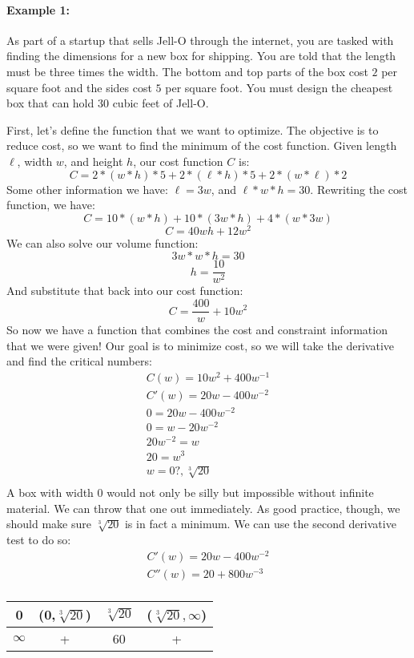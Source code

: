 \documentclass[../revisedmain.tex]{subfiles}
\begin{document}
	\paragraph{Example 1:} As part of a startup that sells Jell-O\textsuperscript{\textregistered} through the internet, you are tasked with finding the dimensions for a new box for shipping. You are told that the length must be three times the width. The bottom and top parts of the box cost $2$ per square foot and the sides cost $5$ per square foot. You must design the cheapest box that can hold $30$ cubic feet of Jell-O\textsuperscript{\textregistered}.\\\newline\par First, let's define the function that we want to optimize. The objective is to reduce cost, so we want to find the minimum of the cost function. Given length $\ell$, width $w$, and height $h$, our cost function $C$ is:
	\[
	C=2*(w*h)*5+2*(\ell*h)*5+2*(w*\ell)*2
	\]
	Some other information we have: $\ell=3w$, and $\ell*w*h=30$. Rewriting the cost function, we have:
	\[
	C=10*(w*h)+10*(3w*h)+4*(w*3w)
	\]
	\[
	C=40wh+12w^2
	\]
	We can also solve our volume function:\[3w*w*h=30\]\[h=\frac{10}{w^2}\] And substitute that back into our cost function:
	\[
	C=\frac{400}{w}+10w^2
	\]
	So now we have a function that combines the cost and constraint information that we were given! Our goal is to minimize cost, so we will take the derivative and find the critical numbers:
	\begin{gather*}
		C(w)=10w^2+400w^{-1}\\
		C'(w)=20w-400w^{-2}\\
		0=20w-400w^{-2}\\
		0=w-20w^{-2}\\
		20w^{-2}=w\\
		20=w^3\\
		w=0?,\sqrt[3]{20}\\
	\end{gather*}
	A box with width $0$ would not only be silly but impossible without infinite material. We can throw that one out immediately. As good practice, though, we should make sure $\sqrt[3]{20}$ is in fact a minimum. We can use the second derivative test to do so:
	\begin{gather*}
		C'(w)=20w-400w^{-2}\\
		C''(w)=20+800w^{-3}\\
	\end{gather*}
	\begin{center}
		\begin{tabular}{ |c|c|c|c| } 
			\hline
			0 & (0,$\sqrt[3]{20}$)&$\sqrt[3]{20}$&($\sqrt[3]{20},\infty$)\\ \hline
			$\infty$& + & 60 & +\\
			\hline
		\end{tabular}
	\end{center}
\end{document}
